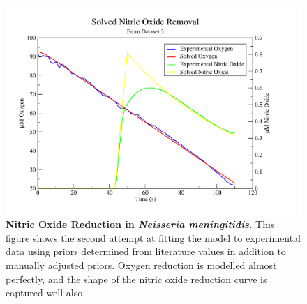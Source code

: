 \begin{figure}[tbp]
 \centering
 \includegraphics[width=15cm, trim=1cm 1cm 3cm 1cm, clip=true]{./06-noreduction/data/aer-no-sim1-2.pdf}
 \caption[{Nitric Oxide Reduction in \textit{Neisseria meningitidis}.}]{{\bf Nitric Oxide Reduction in \textit{Neisseria meningitidis}.} This figure shows the second attempt at fitting the model to experimental data using priors determined from literature values in addition to manually adjusted priors. Oxygen reduction is modelled almost perfectly, and the shape of the nitric oxide reduction curve is captured well also.}
 \label{fig:nosim1.2}
\end{figure}



